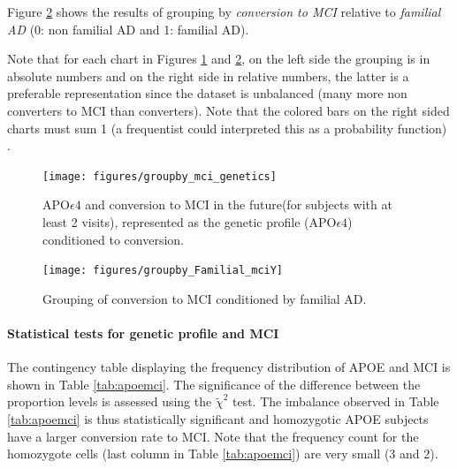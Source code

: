 \documentclass[11pt]{article}
\theoremstyle{definition}
\theoremstyle{remark}
\begin{document}
Figure \ref{fig:groupby_mci_fami} shows the results of grouping by \emph{conversion to MCI} relative to \emph{familial AD} (0: non familial AD and 1: familial AD).

Note that for each chart in Figures \ref{fig:groupby_mci_genetics} and  \ref{fig:groupby_mci_fami}, on the left side the grouping is in absolute numbers and on the right side in relative numbers, the latter is a preferable representation since the dataset is unbalanced (many more non converters to MCI than converters). Note that the colored bars on the right sided charts must sum 1 (a frequentist could interpreted this as a probability function) \cite{Gomez-ramirez_limitations_2013}. 
\begin{figure}[!htb]
        \centering
        \texttt{[image: figures/groupby\_mci\_genetics]}
        \caption{APO$\epsilon4$ and conversion to MCI in the future(for subjects with at least 2 visits), represented as the genetic profile (APO$\epsilon4$) conditioned to conversion.} 
        \label{fig:groupby_mci_genetics}
\end{figure}

\begin{figure}[!htb]
        \centering
        \texttt{[image: figures/groupby\_Familial\_mciY]}
        \caption{Grouping of conversion to MCI conditioned by familial AD.} 
        \label{fig:groupby_mci_fami}
\end{figure}

\paragraph*{Statistical tests for genetic profile and MCI}

The contingency table displaying the frequency distribution of APOE and MCI is shown in Table \ref{tab:apoemci}. The significance of the difference between the proportion levels is assessed using the $\tilde{\chi}^2$ test. The imbalance observed in Table \ref{tab:apoemci} is thus statistically significant and homozygotic APOE subjects have a larger conversion rate to MCI. Note that the frequency count for the homozygote cells (last column in Table \ref{tab:apoemci}) are very small (3 and 2). 
\end{document}
